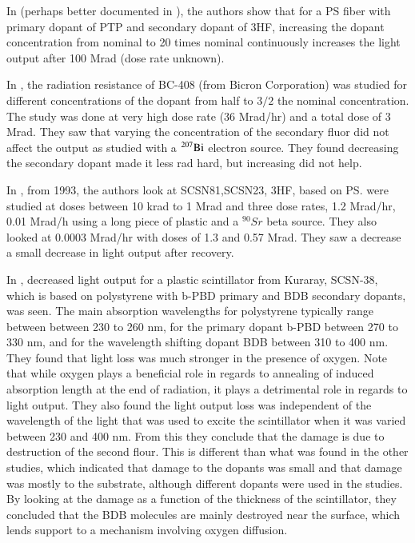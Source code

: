 \documentclass[review]{elsarticle}
\begin{document}
In \cite{zorn3} (perhaps better documented in \cite{sauli}), the authors show that for a PS fiber with primary dopant of PTP and secondary dopant of 3HF,
increasing the dopant concentration from nominal to 20 times nominal continuously increases the light output after 100 Mrad (dose rate unknown).

In \cite{Majewski1989500}, the radiation resistance of BC-408 (from Bicron Corporation) was studied for different concentrations of the dopant from half to $3/2$ the nominal concentration.  The study was done at very high dose rate (36 Mrad/hr) and a total dose of 3 Mrad.  They saw that varying the concentration of the secondary fluor did not affect the output as studied with a $\rm{^{207}Bi}$ electron source.  They found decreasing the secondary dopant made it less rad hard, but increasing did not help.  

In \cite{Giokaris1993315}, from 1993, the authors look at SCSN81,SCSN23, 3HF, based on PS. were studied at doses between 10 krad to 1 Mrad and three dose rates, 1.2 Mrad/hr, 0.01 Mrad/h using a long piece of plastic and a ${^{90}Sr}$ beta source.
They also looked at 0.0003 Mrad/hr with doses of 1.3 and 0.57 Mrad.
They saw a decrease a small decrease in light output after recovery.

In \cite{Wick1991472}, decreased light
output for a plastic scintillator from Kuraray, SCSN-38, which
is based on polystyrene with b-PBD primary and BDB secondary dopants, was seen.
The main absorption wavelengths for polystyrene typically range between
between 230 to 260 nm, for the primary dopant b-PBD between 270 to 330 nm,
and for the wavelength shifting dopant BDB between 310 to 400 nm.
They found that light loss was much stronger in the presence of oxygen.
Note that while oxygen plays a beneficial role in regards
to annealing of induced absorption length at the end of radiation, 
it plays a detrimental role in 
regards to light output.  
They also found the light output loss
was independent of the wavelength of the light
that was used to excite the scintillator when it
was varied between 230 and 400 nm.
From this they conclude that the damage is due to destruction
of the second flour.  This is different than what was found in
the other studies, which indicated that damage to the dopants was
small and that damage was mostly to the substrate,
although different dopants were used in the studies.
By looking at the damage as a function of the thickness of the scintillator,
they concluded that the BDB molecules are mainly destroyed
near the surface, which lends support to a mechanism involving
oxygen diffusion.
\end{document}
